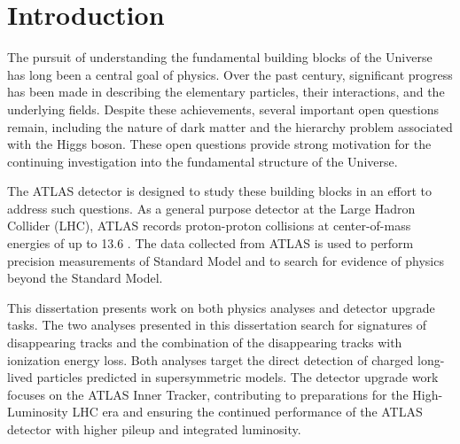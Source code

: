 \chapter{Introduction}
The pursuit of understanding the fundamental building blocks of the Universe has long been a central goal of physics. Over the past century, significant progress has been made in describing the elementary particles, their interactions, and the underlying fields.
Despite these achievements, several important open questions remain, including the nature of dark matter and the hierarchy problem associated with the Higgs boson. These open questions provide strong motivation for the continuing investigation into the fundamental structure of the Universe.

The ATLAS detector is designed to study these building blocks in an effort to address such questions. As a general purpose detector at the Large Hadron Collider (LHC), ATLAS records proton-proton collisions at center-of-mass energies of up to 13.6 \TeV. The data collected from ATLAS is used to perform precision measurements of Standard Model and to search for evidence of physics beyond the Standard Model.


This dissertation presents work on both physics analyses and detector upgrade tasks. 
The two analyses presented in this dissertation search for signatures of disappearing tracks and the combination of the disappearing tracks with ionization energy loss. 
Both analyses target the direct detection of charged long-lived particles predicted in supersymmetric models. 
The detector upgrade work focuses on the ATLAS Inner Tracker, contributing to preparations for the High-Luminosity LHC era and ensuring the continued performance of the ATLAS detector with higher pileup and integrated luminosity.

